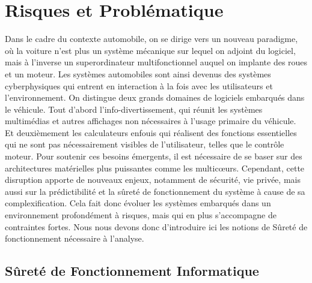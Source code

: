 \documentclass[french, a4paper, 11pt, twoside, pdftex]{StyleThese}
\begin{document}
\section{Risques et Problématique}
	Dans le cadre du contexte automobile, on se dirige  vers un nouveau paradigme, où la voiture n'est plus un système mécanique sur lequel on adjoint du logiciel, mais à l'inverse un superordinateur multifonctionnel auquel on implante des roues et un moteur. 
	Les systèmes automobiles sont ainsi devenus des systèmes cyberphysiques qui entrent en interaction à la fois avec les utilisateurs et l'environnement. On distingue deux grands domaines de logiciels embarqués dans le véhicule. Tout d'abord l'info-divertissement, qui réunit les systèmes multimédias et autres affichages non nécessaires à l'usage primaire du véhicule. Et deuxièmement les calculateurs enfouis qui réalisent des fonctions essentielles qui ne sont pas nécessairement visibles de l'utilisateur, telles que le contrôle moteur. Pour soutenir ces besoins émergents, il est nécessaire de se baser sur des architectures matérielles plus puissantes comme les multicœurs. Cependant, cette disruption apporte de nouveaux enjeux, notamment de sécurité, vie privée, mais aussi sur la prédictibilité et la sûreté de fonctionnement du système à cause de sa complexification. Cela fait donc évoluer les systèmes embarqués dans un environnement profondément à risques, mais qui en plus s'accompagne de contraintes fortes. Nous nous devons donc d'introduire ici les notions de Sûreté de fonctionnement nécessaire à l'analyse.

	\subsection{Sûreté de Fonctionnement Informatique}~\label{sec:SureteDeFonctionnement}
\end{document}
